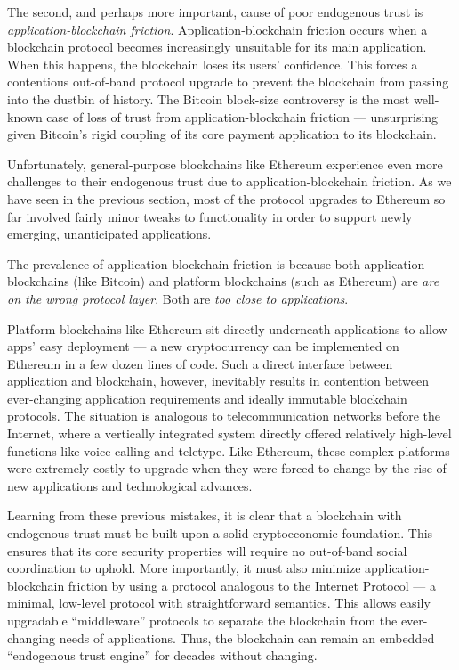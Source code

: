 \documentclass[headinclude,12pt]{scrbook}
\begin{document}
The second, and perhaps more important, cause of poor endogenous trust is \emph{application-blockchain friction}. Application-blockchain friction occurs when a blockchain protocol becomes increasingly unsuitable for its main application. When this happens, the blockchain loses its users' confidence. This forces a contentious out-of-band protocol upgrade to prevent the blockchain from passing into the dustbin of history. The Bitcoin block-size controversy is the most well-known case of loss of trust from application-blockchain friction --- unsurprising given Bitcoin's rigid coupling of its core payment application to its blockchain.

Unfortunately, general-purpose blockchains like Ethereum experience even more challenges to their endogenous trust due to application-blockchain friction. As we have seen in the previous section, most of the protocol upgrades to Ethereum so far involved fairly minor tweaks to functionality in order to support newly emerging, unanticipated applications.

The prevalence of application-blockchain friction is because both application blockchains (like Bitcoin) and platform blockchains (such as Ethereum) are \textit{are on the wrong protocol layer}. Both are \emph{too close to applications}.

Platform blockchains like Ethereum sit directly underneath applications to allow apps' easy deployment --- a new cryptocurrency can be implemented on Ethereum in a few dozen lines of code. Such a direct interface between application and blockchain, however, inevitably results in contention between ever-changing application requirements and ideally immutable blockchain protocols. The situation is analogous to telecommunication networks before the Internet, where a vertically integrated system directly offered relatively high-level functions like voice calling and teletype. Like Ethereum, these complex platforms were extremely costly to upgrade when they were forced to change by the rise of new applications and technological advances.

Learning from these previous mistakes, it is clear that a blockchain with endogenous trust must be built upon a solid cryptoeconomic foundation. This ensures that its core security properties will require no out-of-band social coordination to uphold. More importantly, it must also minimize application-blockchain friction by using a protocol analogous to the Internet Protocol --- a minimal, low-level protocol with straightforward semantics. This allows easily upgradable ``middleware'' protocols to separate the blockchain from the ever-changing needs of applications. Thus, the blockchain can remain an embedded ``endogenous trust engine'' for decades without changing.
\end{document}
